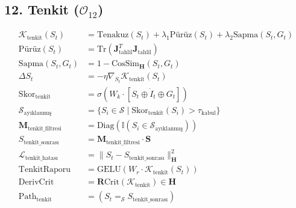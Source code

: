 \documentclass[11pt, a4paper]{article}
\begin{document}
\subsection{12. Tenkit ($\mathcal{O}_{12}$)}
\begin{align}
\mathcal{K}_{\text{tenkit}}(S_t) &= \text{Tenakuz}(S_t) + \lambda_1 \text{Pürüz}(S_t) + \lambda_2 \text{Sapma}(S_t, G_t) \\
\text{Pürüz}(S_t) &= \text{Tr}(\mathbf{J}_{\text{tahlil}}^T \mathbf{J}_{\text{tahlil}}) \\
\text{Sapma}(S_t, G_t) &= 1 - \text{CosSim}_{\mathbf{H}}(S_t, G_t) \\
\Delta S_t &= -\eta \nabla_{S_t} \mathcal{K}_{\text{tenkit}}(S_t) \\
\text{Skor}_{\text{tenkit}} &= \sigma\left( W_k \cdot [S_t \oplus \dot{I}_t \oplus G_t] \right) \\
\mathcal{S}_{\text{ayıklanmış}} &= \{ S_i \in \mathcal{S} \mid \text{Skor}_{\text{tenkit}}(S_i) > \tau_{\text{kabul}} \} \\
\mathbf{M}_{\text{tenkit\_filtresi}} &= \text{Diag}(\mathbb{I}(S_i \in \mathcal{S}_{\text{ayıklanmış}})) \\
S_{\text{tenkit\_sonrası}} &= \mathbf{M}_{\text{tenkit\_filtresi}} \cdot \mathbf{S} \\
\mathcal{L}_{\text{tenkit\_hatası}} &= \| S_t - S_{\text{tenkit\_sonrası}} \|_{\mathbf{H}}^2 \\
\text{TenkitRaporu} &= \text{GELU}(W_r \cdot \mathcal{K}_{\text{tenkit}}(S_t)) \\
\text{DerivCrit} &= \mathbf{R}\text{Crit}(\mathcal{K}_{\text{tenkit}}) \in \mathbf{H} \\
\text{Path}_{\text{tenkit}} &= (S_t =_{\mathcal{S}} S_{\text{tenkit\_sonrası}})
\end{align}
\end{document}
